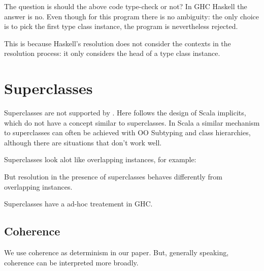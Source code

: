 The question is should the above code type-check or not? In GHC Haskell the answer is no. 
Even though for this program there is no ambiguity: the only choice is to pick the first 
type class instance, the program is nevertheless rejected. 

This is because Haskell's resolution does not consider the contexts in the resolution process:
it only considers the head of a type class instance. 

\section{Superclasses}

Superclasses are not supported by \name. Here \name follows the design of Scala implicits, which 
do not have a concept similar to superclasses. In Scala a similar mechanism to 
superclasses can often be achieved with OO Subtyping and class hierarchies, although there are situations 
that don't work well.  

Superclasses look alot like overlapping instances, for example:

\begin{code}

\end{code}

But resolution in the presence of superclasses behaves differently from overlapping instances. 

Superclasses have a ad-hoc treatement in GHC. 

\subsection{Coherence}

We use coherence as determinism in our paper. But, generally speaking, coherence can be interpreted
more broadly. 


 